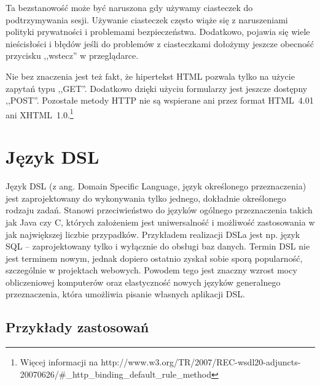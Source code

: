 \documentclass[a4paper,12pt,oneside]{report}
\begin{document}
Ta bezstanowość może być naruszona gdy używamy ciasteczek do podtrzymywania sesji. Używanie ciasteczek często wiąże się z naruszeniami polityki prywatności i problemami bezpieczeństwa. Dodatkowo, pojawia się wiele nieścisłości i błędów jeśli do problemów z ciasteczkami dołożymy jeszcze obecność przycisku ,,wstecz'' w przeglądarce.

Nie bez znaczenia jest też fakt, że hipertekst HTML pozwala tylko na użycie zapytań typu ,,GET''. Dodatkowo dzięki użyciu formularzy jest jeszcze dostępny ,,POST''. Pozostałe metody HTTP nie są wspierane ani przez format HTML~4.01 ani XHTML~1.0.\footnote{Więcej informacji na http://www.w3.org/TR/2007/REC-wsdl20-adjuncts-20070626/\#\_http\_binding\_default\_rule\_method}

\section{Język DSL}
\label{sec:dsl}
Język DSL (z ang. Domain Specific Language, język określonego przeznaczenia) jest zaprojektowany do wykonywania tylko jednego, dokładnie określonego rodzaju zadań. Stanowi przeciwieństwo do języków ogólnego przeznaczenia takich jak Java czy C, których założeniem jest uniwersalność i możliwość zastosowania w jak największej liczbie przypadków. Przykładem realizacji DSLa jest np. język SQL -- zaprojektowany tylko i wyłącznie do obsługi baz danych. Termin DSL nie jest terminem nowym, jednak dopiero ostatnio zyskał sobie sporą popularność, szczególnie w projektach webowych. Powodem tego jest znaczny wzrost mocy obliczeniowej komputerów oraz elastyczność nowych języków generalnego przeznaczenia, która umożliwia pisanie własnych aplikacji DSL.

\subsection{Przykłady zastosowań}
\label{sub:zastosowania}
\end{document}
